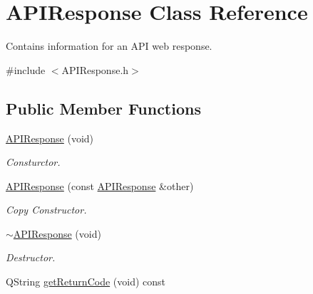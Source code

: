 \hypertarget{class_a_p_i_response}{}\section{A\+P\+I\+Response Class Reference}
\label{class_a_p_i_response}


Contains information for an A\+PI web response.  




{\ttfamily \#include $<$A\+P\+I\+Response.\+h$>$}

\subsection*{Public Member Functions}
\begin{DoxyCompactItemize}
\item 
\mbox{\label{class_a_p_i_response_a8819d39477f85cf49f9d951c3f20b48a}} 
\hyperlink{class_a_p_i_response_a8819d39477f85cf49f9d951c3f20b48a}{A\+P\+I\+Response} (void)
\begin{DoxyCompactList}\small\item\em Consturctor. \end{DoxyCompactList}\item 
\mbox{\label{class_a_p_i_response_ad9f5238fb178a139f7d90f0024c094bd}} 
\hyperlink{class_a_p_i_response_ad9f5238fb178a139f7d90f0024c094bd}{A\+P\+I\+Response} (const \hyperlink{class_a_p_i_response}{A\+P\+I\+Response} \&other)
\begin{DoxyCompactList}\small\item\em Copy Constructor. \end{DoxyCompactList}\item 
\mbox{\label{class_a_p_i_response_acd88184e036df13fb200120e545bd1aa}} 
\hyperlink{class_a_p_i_response_acd88184e036df13fb200120e545bd1aa}{$\sim$\+A\+P\+I\+Response} (void)
\begin{DoxyCompactList}\small\item\em Destructor. \end{DoxyCompactList}\item 
\mbox{\label{class_a_p_i_response_a0ac0de9b5ec19f313d1571936d88c2f1}} 
Q\+String \hyperlink{class_a_p_i_response_a0ac0de9b5ec19f313d1571936d88c2f1}{get\+Return\+Code} (void) const

\end{DoxyCompactItemize}
